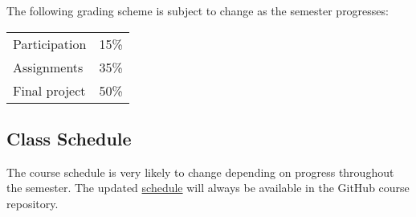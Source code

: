 The following grading scheme is subject to change as the semester
progresses:

\begin{center}
\begin{tabular}{ll}
Participation	& 15\% \\
Assignments	& 35\% \\
Final project	& 50\% \\
\end{tabular}
\end{center}

\subsection*{Class Schedule}
The course schedule is very likely to change depending on progress
throughout the semester. The updated \href{schedule.md}{schedule} will
always be available in the GitHub course repository.

